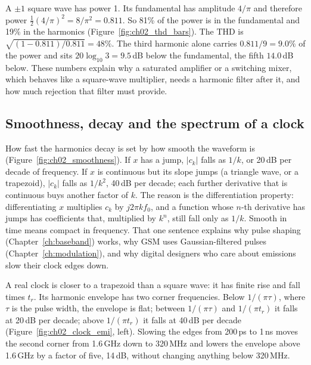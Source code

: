 \begin{worked}
A $\pm1$ square wave has power 1. Its fundamental has amplitude $4/\pi$ and therefore power
$\tfrac12(4/\pi)^2=8/\pi^2=0.811$. So 81\% of the power is in the fundamental and 19\% in the
harmonics (Figure~\ref{fig:ch02_thd_bars}). The THD is $\sqrt{(1-0.811)/0.811}=48\%$. The third
harmonic alone carries $0.811/9=9.0\%$ of the power and sits $20\log_{10}3=9.5$\,dB below the
fundamental, the fifth $14.0$\,dB below. These numbers explain why a saturated amplifier or a
switching mixer, which behaves like a square-wave multiplier, needs a harmonic filter after it, and
how much rejection that filter must provide.
\end{worked}

\subsection{Smoothness, decay and the spectrum of a clock}

How fast the harmonics decay is set by how smooth the waveform is
(Figure~\ref{fig:ch02_smoothness}). If $x$ has a jump, $|c_k|$ falls as $1/k$, or 20\,dB per decade of
frequency. If $x$ is continuous but its slope jumps (a triangle wave, or a trapezoid), $|c_k|$ falls
as $1/k^2$, 40\,dB per decade; each further derivative that is continuous buys another factor of $k$.
The reason is the differentiation property: differentiating $x$ multiplies $c_k$ by $j2\pi kf_0$, and
a function whose $n$-th derivative has jumps has coefficients that, multiplied by $k^n$, still fall
only as $1/k$. Smooth in time means compact in frequency. That one sentence explains why pulse
shaping (Chapter~\ref{ch:baseband}) works, why GSM uses Gaussian-filtered pulses
(Chapter~\ref{ch:modulation}), and why digital designers who care about emissions slow their clock
edges down.


A real clock is closer to a trapezoid than a square wave: it has finite rise and fall times $t_r$.
Its harmonic envelope has two corner frequencies. Below $1/(\pi\tau)$, where $\tau$ is the pulse
width, the envelope is flat; between $1/(\pi\tau)$ and $1/(\pi t_r)$ it falls at 20\,dB per
decade; above $1/(\pi t_r)$ it falls at 40\,dB per decade (Figure~\ref{fig:ch02_clock_emi}, left).
Slowing the edges from 200\,ps to 1\,ns moves the second corner from 1.6\,GHz down to 320\,MHz and
lowers the envelope above 1.6\,GHz by a factor of five, 14\,dB, without changing anything below
320\,MHz.

